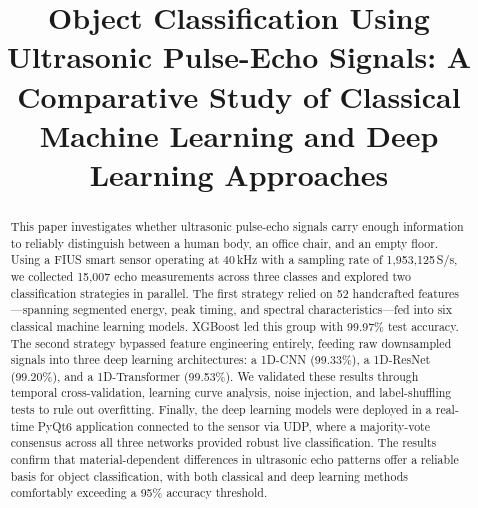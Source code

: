 \documentclass[conference,a4paper]{IEEEtran}
\begin{document}
\title{Object Classification Using Ultrasonic Pulse-Echo Signals: A Comparative Study of Classical Machine Learning and Deep Learning Approaches}

\author{
\and
{}
\and
{}
}

\maketitle

\begin{abstract}
This paper investigates whether ultrasonic pulse-echo signals carry enough information to reliably distinguish between a human body, an office chair, and an empty floor. Using a FIUS smart sensor operating at 40\,kHz with a sampling rate of 1,953,125\,S/s, we collected 15,007 echo measurements across three classes and explored two classification strategies in parallel. The first strategy relied on 52 handcrafted features---spanning segmented energy, peak timing, and spectral characteristics---fed into six classical machine learning models. XGBoost led this group with 99.97\% test accuracy. The second strategy bypassed feature engineering entirely, feeding raw downsampled signals into three deep learning architectures: a 1D-CNN (99.33\%), a 1D-ResNet (99.20\%), and a 1D-Transformer (99.53\%). We validated these results through temporal cross-validation, learning curve analysis, noise injection, and label-shuffling tests to rule out overfitting. Finally, the deep learning models were deployed in a real-time PyQt6 application connected to the sensor via UDP, where a majority-vote consensus across all three networks provided robust live classification. The results confirm that material-dependent differences in ultrasonic echo patterns offer a reliable basis for object classification, with both classical and deep learning methods comfortably exceeding a 95\% accuracy threshold.
\end{abstract}
\end{document}
